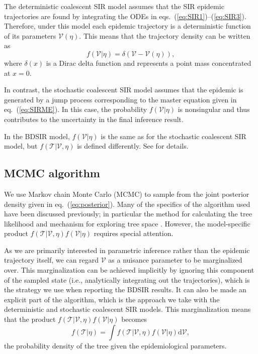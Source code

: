 \documentclass[12pt,titlepage]{article}
\newcommand{\traj}{\mathcal{V}}
\newcommand{\tree}{\mathcal{T}}
\begin{document}
The deterministic coalescent SIR model assumes that the SIR epidemic
trajectories are found by integrating the ODEs in
eqs.~(\ref{eq:SIR1})--(\ref{eq:SIR3}).  Therefore, under this model each
epidemic trajectory is a deterministic function of its parameters
$\traj(\eta)$.  This means that the trajectory density can be written as
\begin{equation}
f(\traj|\eta)=\delta(\traj-\traj(\eta)),
\end{equation}
where $\delta(x)$ is a Dirac delta function and represents a point
mass concentrated at $x=0$.

In contrast, the stochastic coalescent SIR model assumes that the
epidemic is generated by a jump process corresponding to the master
equation given in eq.~(\ref{eq:SIRME}). In this case, the probability
$f(\traj|\eta)$ is nonsingular and thus contributes to the uncertainty
in the final inference result.

In the BDSIR model, $f(\traj|\eta)$ is the same as for the stochastic
coalescent SIR model, but $f(\tree|\traj,\eta)$ is defined
differently.  See \cite{Kuhnert:2014} for details.

\subsection{MCMC algorithm}

We use Markov chain Monte Carlo (MCMC) to sample from the joint
posterior density given in eq.~(\ref{eq:posterior}).  Many of the
specifics of the algorithm used have been discussed previously; in
particular the method for calculating the tree likelihood
\citep{Felsenstein:1981,Felsenstein:2004} and mechanism for exploring
tree space \citep{Drummond:2002}. However, the model-specific product
$f(\tree|\traj,\eta)f(\traj|\eta)$ requires special attention.

As we are primarily interested in parametric inference rather than the
epidemic trajectory itself, we can regard $\traj$ as a nuisance
parameter to be marginalized over. This marginalization can be
achieved implicitly by ignoring this component of the sampled state (i.e., analytically integrating out the trajectories),
which is the strategy we use when reporting the BDSIR results. It can
also be made an explicit part of the algorithm, which is the approach
we take with the deterministic and stochastic coalescent SIR
models. This marginalization means that the product
$f(\tree|\traj,\eta)f(\traj|\eta)$ becomes
\begin{equation}
f(\tree|\eta)=\int f(\tree|\traj,\eta)f(\traj|\eta)\mathrm{d}\traj,
\label{eq:treeprior}
\end{equation}
the probability density of the tree given the epidemiological parameters.
\end{document}
